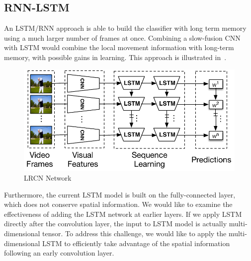 \subsection{RNN-LSTM}
An LSTM/RNN approach is able to build the classifier with long term memory using a much larger number of frames at once. Combining a slow-fusion CNN with LSTM would combine the local movement information with long-term memory, with possible gains in learning. This approach is illustrated in~.
\begin{figure}
  \centering
  \includegraphics[width=1.0\linewidth]{figs/lcrn}
  \caption{LRCN Network}
  \label{fig:lcrn}
\end{figure}
Furthermore, the current LSTM model is built on the fully-connected
layer, which does not conserve spatial information. We would like to examine the 
effectiveness of adding the LSTM network at earlier layers.
If we apply LSTM directly after the convolution layer,
the input to LSTM model is actually multi-dimensional tensor. To address
this challenge, we would like to apply the multi-dimensional LSTM
\cite{byeon2015scene} to efficiently take advantage of the spatial
information following an early convolution layer. 

